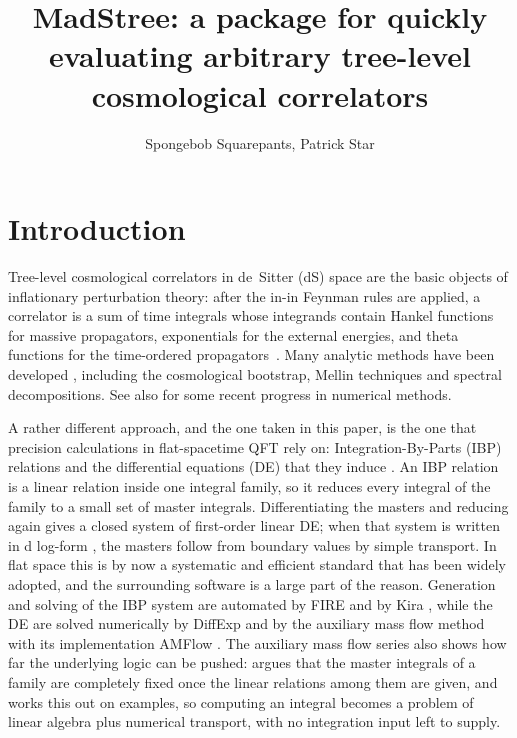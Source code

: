 \documentclass[11pt,a4paper]{article}
\title{MadStree: a package for quickly evaluating arbitrary tree-level cosmological correlators}
\author{Spongebob Squarepants, Patrick Star}
\begin{document}
\maketitle

\section{Introduction}
\label{sec:introduction}

Tree-level cosmological correlators in de~Sitter (dS) space are the basic objects of
inflationary perturbation theory: after the in-in Feynman rules are applied, a correlator is a sum
of time integrals whose integrands contain Hankel functions for massive propagators, exponentials
for the external energies, and theta functions for the time-ordered propagators~\cite{Weinberg:2005vy,Chen:2017ryl}. Many analytic methods have been developed \cite{Arkani-Hamed:2018kmz,Baumann:2019oyu,Baumann:2020dch,Pajer:2020wnj,Pajer:2020wxk,Cabass:2021fnw,Baumann:2022jpr,Pimentel:2022fsc,Jazayeri:2022kjy,Wang:2022eop,Qin:2023ejc,Aoki:2024uyi,Liu:2024str,Xianyu:2025lbk,Chen:2023xlt,Tao:2022nqc,Chen:2023bji,Sleight:2019mgd,Sleight:2019hfp,Sleight:2020obc,Sleight:2021plv,Premkumar:2021mlz,Qin:2022lva,Qin:2022fbv,Xianyu:2023ytd,Qin:2024gtr,Marolf:2010zp,Xianyu:2022jwk,Loparco:2023rug,Werth:2024mjg,Qin:2025xct,Zhang:2025nzd,Altshuler:2025qmk,Liu:2024xyi,Das:2026vfv}, including the cosmological bootstrap, Mellin techniques and spectral decompositions. See also \cite{Wang:2021qez,Werth:2023pfl,Pinol:2023oux,Werth:2024aui,Chen:2023iix,Chen:2024glu} for some recent progress in numerical methods.

A rather different approach, and the one taken in this paper, is the one that precision calculations in
flat-spacetime QFT rely on: Integration-By-Parts (IBP) relations \cite{Chetyrkin:1981qh} and the
differential equations (DE) that they induce \cite{Kotikov:1990kg,Kotikov:1991pm,Bern:1993kr,Gehrmann:1999as}.
An IBP relation is a linear relation inside one integral family, so it reduces every integral of the family
to a small set of master integrals. Differentiating the masters and reducing again gives a closed system of
first-order linear DE; when that system is written in d log-form \cite{Henn:2013pwa}, the masters follow
from boundary values by simple transport. In flat space this is by now a systematic and efficient standard
that has been widely adopted, and the surrounding software is a large part of the reason. Generation and
solving of the IBP system are automated by FIRE \cite{Smirnov:2019qkx,Smirnov:2025prc} and by Kira
\cite{Maierhofer:2017gsa,Klappert:2020nbg,Lange:2025fba}, while the DE are solved numerically by DiffExp
\cite{Hidding:2020ytt} and by the auxiliary mass flow method with its implementation AMFlow
\cite{Liu:2017jxz,Liu:2020kpc,Liu:2022chg,Huang:2026rjb}. The auxiliary mass flow series also shows how far
the underlying logic can be pushed: \cite{Liu:2022mfb} argues that the master integrals of a family
are completely fixed once the linear relations among them are given, and works this out on examples,
so computing an integral becomes a problem of linear algebra plus numerical transport, with no
integration input left to supply.
\end{document}
